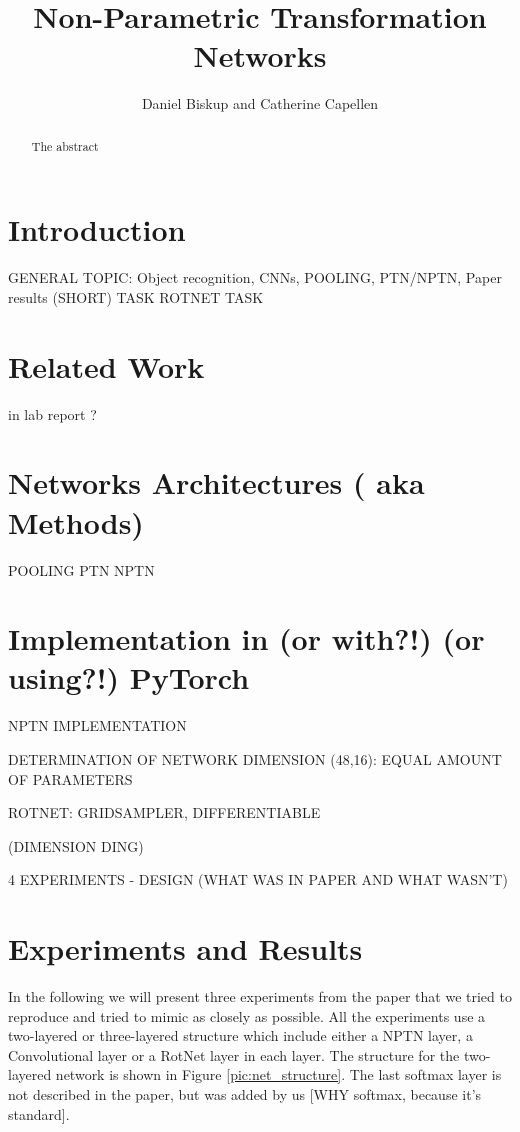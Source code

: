 \documentclass{llncs}
\begin{document}
%
\frontmatter          %
%
\pagestyle{headings}  %
%
\mainmatter              %
%
\title{Non-Parametric Transformation Networks}
%
%  
%
\author{Daniel Biskup and Catherine Capellen}
%
%
%

\maketitle              %

\begin{abstract}
The abstract 
\end{abstract}
%

\section{Introduction}
GENERAL TOPIC: Object recognition, CNNs, POOLING, PTN/NPTN, Paper results (SHORT) 
TASK
ROTNET TASK
\section{Related Work}
in lab report ?
\section{Networks Architectures ( aka Methods)}
POOLING PTN NPTN 
\section{Implementation in (or with?!) (or using?!) PyTorch}
NPTN IMPLEMENTATION

DETERMINATION OF NETWORK DIMENSION (48,16): EQUAL AMOUNT OF PARAMETERS

ROTNET: GRIDSAMPLER, DIFFERENTIABLE
 
(DIMENSION DING)

4 EXPERIMENTS
- DESIGN (WHAT WAS IN PAPER AND WHAT WASN'T)

\section{Experiments and Results}	
In the following we will present three experiments from the paper that we tried to reproduce and tried to mimic as closely as possible. 
All the experiments use a two-layered or three-layered structure which include either a NPTN layer, a Convolutional layer or a RotNet layer in each layer. The structure for the two-layered network is shown in Figure \ref{pic:net_structure}. The last softmax layer is not described in the paper, but was added by us [WHY softmax, because it's standard]. 
\end{document}
